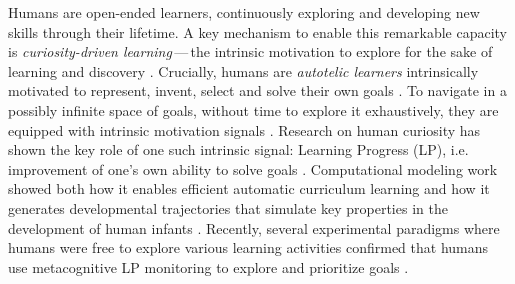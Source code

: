




Humans are open-ended learners, continuously exploring and developing new skills through their lifetime. A key mechanism to enable this remarkable capacity is \textit{curiosity-driven learning}\,---\,the intrinsic motivation to explore for the sake of learning and discovery \cite{berlyne1954theory, kidd2015psychology}. Crucially, humans are \textit{autotelic learners} intrinsically motivated to represent, invent, select and solve their own goals \cite{colas2022language}. To navigate in a possibly infinite space of goals, without time to explore it exhaustively, they are equipped with intrinsic motivation signals \cite{baldassarre2012intrinsically, gottlieb2018towards}. Research on human curiosity has shown the key role of one such intrinsic signal: Learning Progress (LP), i.e. improvement of one’s own ability to solve goals \cite{kaplan2007search}. 
Computational modeling work showed both how it enables efficient automatic curriculum learning \cite{lopes2012strategic,poli2024curiosity} and how it generates developmental trajectories that simulate key properties in the development of human infants \cite{oudeyer2016evolution}. Recently, several experimental paradigms where humans were free to explore various learning activities confirmed that humans use metacognitive LP monitoring to explore and prioritize goals \cite{ten_humans_2021,leonard2023young, sayali2023learning, poli2024exploration}. 

